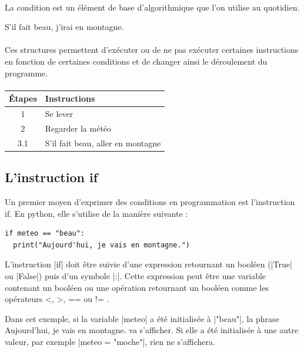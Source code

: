 \documentclass[11pt, a4paper]{book}
\begin{document}
\paragraph{} La condition est un élément de base d'algorithmique que l'on utilise au quotidien.
 \begin{example} S'il fait beau, j'irai en montagne. \end{example}


\paragraph{} Ces structures permettent d'exécuter ou de ne pas exécuter certaines instructions en fonction de certaines conditions et de changer ainsi le déroulement du programme.

\paragraph{}
\begin{tabular}{ c  l  }
     Étapes & Instructions \\ \hline
     1 & Se lever  \\ 
     2 & Regarder la météo  \\
     3.1 & S'il fait beau, aller en montagne  \\
\end{tabular}


\subsection{L'instruction \textsf{if}}
Un premier moyen d'exprimer des conditions en programmation est l'instruction \textsf{if}. En python, elle s'utilise de la manière suivante : 

\begin{lstlisting}
if meteo == "beau":
  print("Aujourd'hui, je vais en montagne.")
\end{lstlisting}

\begin{defi}
L'instruction |if| doit être suivie d'une expression retournant un booléen (|True| ou |False|) puis d'un symbole |:|.  Cette expression peut être une variable contenant un booléen ou une opération retournant un booléen comme les opérateurs <, >, == ou != .
\end{defi}

Dans cet exemple, si la variable |meteo| a été initialisée à |"beau"|, la phrase \textsf{Aujourd'hui, je vais en montagne.} va s'afficher. Si elle a été initialisée à une autre valeur, par exemple |meteo = "moche"|, rien ne s'affichera.
\end{document}
